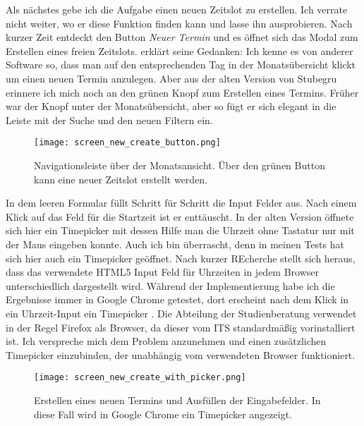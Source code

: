 Als nächstes gebe ich \ipName die Aufgabe einen neuen Zeitslot zu erstellen.
Ich verrate nicht weiter, wo er diese Funktion finden kann und lasse ihn
ausprobieren. Nach kurzer Zeit entdeckt \ipName den Button \textit{Neuer
    Termin} und es öffnet sich das Modal zum Erstellen eines freien Zeitslots.
\ipName erklärt seine Gedanken: \glqq{}Ich kenne es von anderer Software so,
dass man auf den entsprechenden Tag in der Monatsübersicht klickt um einen
neuen Termin anzulegen. Aber aus der alten Version von Stubegru erinnere ich
mich noch an den grünen Knopf zum Erstellen eines Termins. Früher war der Knopf
unter der Monatsübersicht, aber so fügt er sich elegant in die Leiste mit der
Suche und den neuen Filtern ein.\grqq{}

\begin{figure}[H]
    \caption{Navigationsleiste über der Monatsansicht. Über den grünen Button kann eine neuer Zeitslot erstellt werden.}
    \centering
    \texttt{[image: screen\_new\_create\_button.png]}
\end{figure}

In dem leeren Formular füllt \ipName Schritt für Schritt die Input Felder aus.
Nach einem Klick auf das Feld für die Startzeit ist er enttäuscht. In der alten
Version öffnete sich hier ein Timepicker mit dessen Hilfe man die Uhrzeit ohne
Tastatur nur mit der Maus eingeben konnte. Auch ich bin überrascht, denn in
meinen Tests hat sich hier auch ein Timepicker geöffnet. Nach kurzer REcherche
stellt sich heraus, dass das verwendete HTML5 Input Feld für Uhrzeiten in jedem
Browser unterschiedlich dargestellt wird. Während der Implementierung habe ich
die Ergebnisse immer in Google Chrome getestet, dort erscheint nach dem Klick
in ein Uhrzeit-Input ein Timepicker . Die
Abteilung der Studienberatung verwendet in der Regel Firefox als Browser, da
dieser vom ITS standardmäßig vorinstalliert ist. Ich verspreche mich dem
Problem anzunehmen und einen zusätzlichen Timepicker einzubinden, der
unabhängig vom verwendeten Browser funktioniert.

\begin{figure}[H]
    \caption{Erstellen eines neuen Termins und Ausfüllen der Eingabefelder. In diese Fall wird in Google Chrome ein Timepicker angezeigt.}
    \centering
    \texttt{[image: screen\_new\_create\_with\_picker.png]}
\end{figure}

